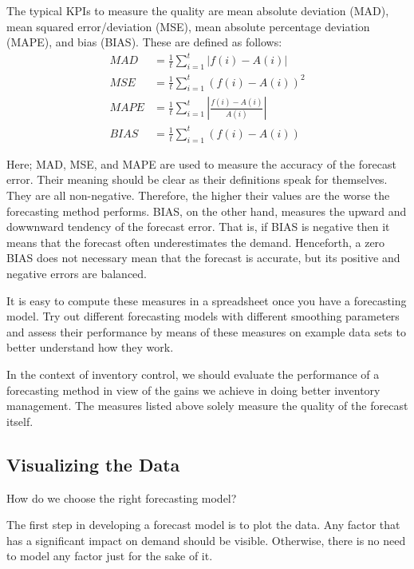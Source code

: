 \begin{solution}
The typical KPIs to measure the quality are mean absolute deviation (MAD), mean squared error/deviation (MSE), mean absolute percentage deviation (MAPE), and bias (BIAS). These are defined as follows:
\begin{align*}
MAD & = \frac{1}{t} \sum_{i=1}^t|f(i)-A(i)| \\
MSE & = \frac{1}{t} \sum_{i=1}^t(f(i)-A(i))^2 \\
MAPE & = \frac{1}{t} \sum_{i=1}^t \left|\frac{f(i)-A(i)}{A(i)}\right| \\
BIAS & = \frac{1}{t} \sum_{i=1}^t(f(i)-A(i))
\end{align*}

Here; MAD, MSE, and MAPE are used to measure the accuracy of the forecast error. Their meaning should be clear as their definitions speak for themselves. They are all non-negative. Therefore, the higher their values are the worse the forecasting method performs. BIAS, on the other hand, measures the upward and dowwnward tendency of the forecast error. That is, if BIAS is negative then it means that the forecast often underestimates the demand. Henceforth, a zero BIAS does not necessary mean that the forecast is accurate, but its positive and negative errors are balanced. 

It is easy to compute these measures in a spreadsheet once you have a forecasting model. Try out different forecasting models with different smoothing parameters and assess their performance by means of these measures on example data sets to better understand how they work.

In the context of inventory control, we should evaluate the performance of a forecasting method in view of the gains we achieve in doing better inventory management. The measures listed above solely measure the quality of the forecast itself.
  \end{solution}



\subsection{Visualizing the Data}

\begin{question}
How do we choose the right forecasting model?
\end{question}

  \begin{solution}
The first step in developing a forecast model is to plot the data. Any factor that has a significant impact on demand should be visible. Otherwise, there is no need to model any factor just for the sake of it. 
  \end{solution}


